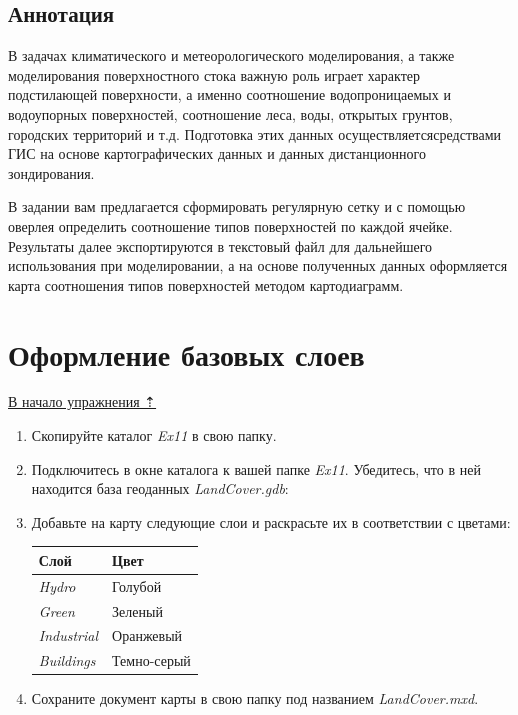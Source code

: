 \documentclass[12pt,]{book}
\begin{document}
\hypertarget{land-cover-hydro-annotation}{%
\subsection{Аннотация}\label{land-cover-hydro-annotation}}

В задачах климатического и метеорологического моделирования, а также моделирования поверхностного стока важную роль играет характер подстилающей поверхности, а именно соотношение водопроницаемых и водоупорных поверхностей, соотношение леса, воды, открытых грунтов, городских территорий и т.д. Подготовка этих данных осуществляетсясредствами ГИС на основе картографических данных и данных дистанционного зондирования.

В задании вам предлагается сформировать регулярную сетку и с помощью оверлея определить соотношение типов поверхностей по каждой ячейке. Результаты далее экспортируются в текстовый файл для дальнейшего использования при моделировании, а на основе полученных данных оформляется карта соотношения типов поверхностей методом картодиаграмм.

\hypertarget{land-cover-hydro-base}{%
\section{Оформление базовых слоев}\label{land-cover-hydro-base}}

\protect\hyperlink{land-cover-hydro}{В начало упражнения ⇡}

\begin{enumerate}
\def\labelenumi{\arabic{enumi}.}
\item
  Скопируйте каталог \emph{Ex11} в свою папку.
\item
  Подключитесь в окне каталога к вашей папке \emph{Ex11}. Убедитесь, что в ней находится база геоданных \emph{LandCover.gdb}:
\item
  Добавьте на карту следующие слои и раскрасьте их в соответствии с цветами:

  \begin{longtable}[]{@{}ll@{}}
  \toprule
  Слой & Цвет\tabularnewline
  \midrule
  \endhead
  \emph{Hydro} & Голубой\tabularnewline
  \emph{Green} & Зеленый\tabularnewline
  \emph{Industrial} & Оранжевый\tabularnewline
  \emph{Buildings} & Темно-серый\tabularnewline
  \bottomrule
  \end{longtable}
\item
  Сохраните документ карты в свою папку под названием \emph{LandCover.mxd}.
\end{enumerate}
\end{document}
